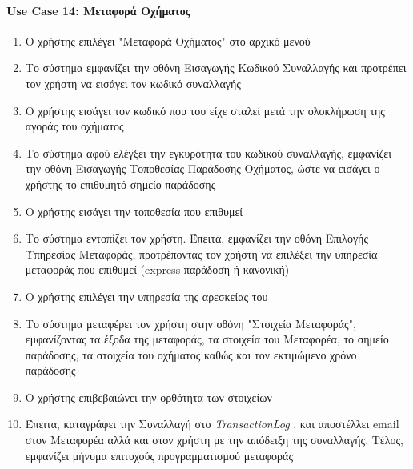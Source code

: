 \documentclass{../ol-softwaremanual}
\begin{document}
	\paragraph{\en Use Case 14: \gr Μεταφορά Οχήματος}  
	\begin{enumerate}
		\item Ο χρήστης επιλέγει \en"\gr Μεταφορά Οχήματος\en" \gr στο αρχικό μενού
		\item Το σύστημα εμφανίζει την οθόνη Εισαγωγής Κωδικού Συναλλαγής και προτρέπει τον χρήστη να εισάγει τον κωδικό συναλλαγής
		\item Ο χρήστης εισάγει τον κωδικό που του είχε σταλεί μετά την ολοκλήρωση της αγοράς του οχήματος
		\item Το σύστημα αφού ελέγξει την εγκυρότητα του κωδικού συναλλαγής, εμφανίζει την οθόνη Εισαγωγής Τοποθεσίας Παράδοσης Οχήματος, ώστε να εισάγει ο χρήστης το επιθυμητό σημείο παράδοσης
		\item Ο χρήστης εισάγει την τοποθεσία που επιθυμεί
		\item Το σύστημα εντοπίζει τον χρήστη. Έπειτα, εμφανίζει την οθόνη Επιλογής Υπηρεσίας Μεταφοράς, προτρέποντας τον χρήστη να επιλέξει την υπηρεσία μεταφοράς που επιθυμεί (\en express \gr παράδοση ή κανονική)		
		\item Ο χρήστης επιλέγει την υπηρεσία της αρεσκείας του
		\item Το σύστημα μεταφέρει τον χρήστη στην οθόνη \en"\gr Στοιχεία Μεταφοράς\en"\gr, εμφανίζοντας τα έξοδα της μεταφοράς, τα στοιχεία του Μεταφορέα, το σημείο παράδοσης, τα στοιχεία του οχήματος καθώς και τον εκτιμώμενο χρόνο παράδοσης 
		\item Ο χρήστης επιβεβαιώνει την ορθότητα των στοιχείων 		
		\item {} Έπειτα, καταγράφει την Συναλλαγή στο \en \textit{TransactionLog} \gr,  και αποστέλλει \en email \gr στον Μεταφορέα αλλά και στον χρήστη με την απόδειξη της συναλλαγής. Τέλος, εμφανίζει μήνυμα επιτυχούς προγραμματισμού μεταφοράς
	\end{enumerate}
	
\end{document}

